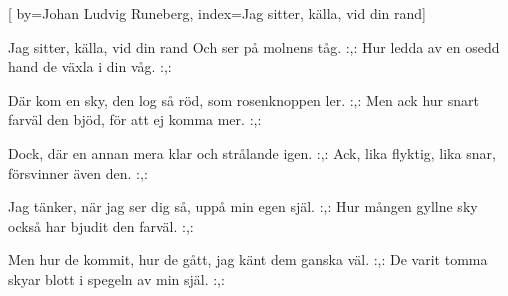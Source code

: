 
[
by={Johan Ludvig Runeberg},
index={Jag sitter, källa, vid din rand}]

\beginverse*
Jag sitter, källa, vid din rand 
Och ser på molnens tåg.
:,: Hur ledda av en osedd hand 
de växla i din våg. :,:
\endverse

\beginverse* 
Där kom en sky, den log så röd, 
som rosenknoppen ler.
:,: Men ack hur snart farväl den bjöd, 
för att ej komma mer. :,:
\endverse

\beginverse* 
Dock, där en annan mera klar 
och strålande igen. 
:,: Ack, lika flyktig, lika snar, 
försvinner även den. :,:
\endverse

\beginverse
Jag tänker, när jag ser dig så, 
uppå min egen själ.
:,: Hur mången gyllne sky också 
har bjudit den farväl. :,:
\endverse

\beginverse* Men hur de kommit, hur de gått,
jag känt dem ganska väl. 
:,: De varit tomma skyar blott
i spegeln av min själ. :,:
\endverse
\endsong


